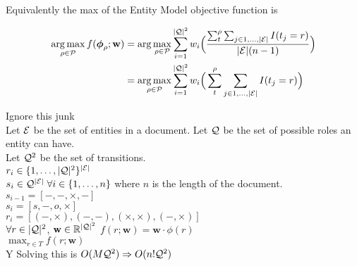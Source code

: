 \documentclass{article}
\newcommand{\entities}{{\cal E}}
\newcommand{\roles}{{\cal Q}}
\newcommand{\Tv}{T}
\newcommand{\tv}{t}
\newcommand{\sent}{s}
\newcommand{\weight}{\mathbf{w}}
\newcommand{\rendering}{\rho}
\newcommand{\renderings}{{\cal P}}
\newcommand{\trans}{r}
\newcommand{\obj}{f}
\newcommand{\commentout}{}
\DeclareMathOperator*{\argmax}{arg\,max}
\begin{document}
Equivalently the max of the Entity Model objective function is


\begin{equation*}
\begin{split}
\argmax_{\rendering \in \renderings} \obj(\boldsymbol{\phi}_\rendering ; \weight ) & =\operatorname{arg} \max_{\rendering \in \renderings}\sum^{|\roles|^2}_{i=1} w_i \Big( \frac{\sum_{\tv}^\rendering\sum_{j\in1,\ldots,|\entities|} I(\tv_{j}= r)  }{|\entities|(n-1)}   \Big)\\
&  =\argmax_{\rendering \in \renderings}\sum^{|\roles|^2}_{i=1} w_i \Big( \sum_{\tv}^\rendering\sum_{j\in1,\ldots,|\entities|} I(\tv_{j}= r)     \Big)\\
\end{split}
\end{equation*} 



\commentout{
Ignore this junk\\
Let $\entities$ be the set of entities in a document.
Let $\roles$ be the set of possible roles an entity can have.\\
Let $\roles^2$ be the set of transitions.\\
$\trans_i \in \{1,\ldots, |\roles|^2\}^{|\entities|}$\\
$\sent_i \in \roles^{|\entities|}\;\forall i \in \{1,\ldots, n\}$ where $n$ is the length of the document.\\
$\sent_{i-1} = [-,-,\times,-]$\\ 
$\sent_{i} = [s,-,o,\times]$\\
$\trans_i = [(-,\times),(-,-),(\times,\times),(-,\times)]$\\ 
$\forall r \in |\roles|^2$, 
$\weight \in \mathbb{R}^{|\roles|^2}$
$f(\trans;\weight) = \weight \cdot \phi(\trans)$\\
$\max_{\trans \in \Tv} f(\trans ; \weight )$\\Y
Solving this is $O(M\roles^2) \Rightarrow O(n!\roles^2)$
}
\end{document}
